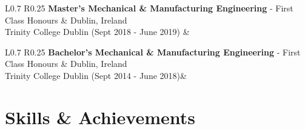 \documentclass[a4paper,11pt]{article}
\newlength{\itemwidth}
\begin{document}
\begin{tabularx}%
{\linewidth}{ L{0.7\linewidth} R{0.25\linewidth}}
    \textbf{Master's Mechanical \& Manufacturing Engineering} - First Class Honours & Dublin, Ireland\\
    Trinity College Dublin (Sept 2018 - June 2019) &
    \\
    [2pt]
\end{tabularx}

\begin{tabularx}%
{\linewidth}{ L{0.7\linewidth} R{0.25\linewidth}}
    \textbf{Bachelor's Mechanical \& Manufacturing Engineering} - First Class Honours & Dublin, Ireland\\
    Trinity College Dublin (Sept 2014 - June 2018)&
     \\[2pt]
\end{tabularx}


\section{Skills \& Achievements}
\end{document}
